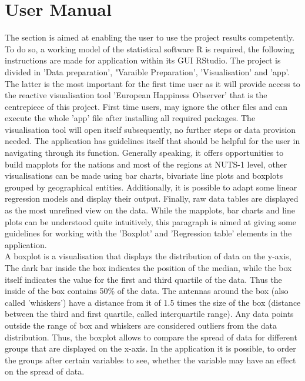 \documentclass[preprint,12pt,authoryear]{elsarticle}
\begin{document}
\section{User Manual}
The section is aimed at enabling the user to use the project results competently. To do so, a working model of the statistical software R is required, the following instructions are made for application within its GUI RStudio. The project is divided in 'Data preparation', "Varaible Preparation', 'Visualisation' and 'app'. The latter is the most important for the first time user as it will provide access to the reactive visualisation tool 'European Happiness Observer' that is the centrepiece of this project. First time users, may ignore the other files and can execute the whole 'app' file after installing all required packages. The visualisation tool will open itself subsequently, no further steps or data provision needed. The application has guidelines itself that should be helpful for the user in navigating through its function. Generally speaking, it offers opportunities to build mapplots for the nations and most of the regions at NUTS-1 level, other visualisations can be made using bar charts, bivariate line plots and boxplots grouped by geographical entities. Additionally, it is possible to adapt some linear regression models and display their output. Finally, raw data tables are displayed as the most unrefined view on the data. While the mapplots, bar charts and line plots can be understood quite intuitively, this paragraph is aimed at giving some guidelines for working with the 'Boxplot' and 'Regression table' elements in the application.\\

A boxplot is a visualisation that displays the distribution of data on the y-axis,  The dark bar inside the box indicates the position of the median, while the box itself indicates the value for the first and third quartile of the data. Thus the inside of the box contains 50\% of the data. The antennas around the box (also called 'whiskers') have a distance from it of 1.5 times the size of the box (distance between the third and first quartile, called interquartile range). Any data points outside the range of box and whiskers are considered outliers from the data distribution. Thus, the boxplot allows to compare the spread of data for different groups that are displayed on the x-axis. In the application it is possible, to order the groups after certain variables to see, whether the variable may have an effect on the spread of data.\\
\end{document}
